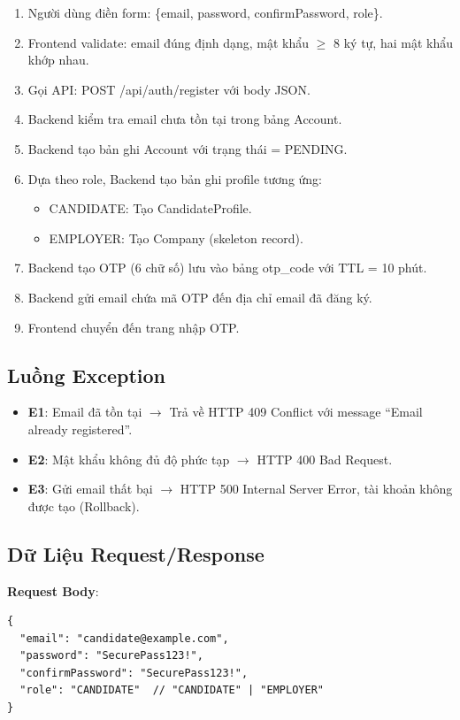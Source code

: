 \documentclass[12pt, a4paper]{report}
\begin{document}
\begin{enumerate}
    \item Người dùng điền form: \{email, password, confirmPassword, role\}.
    \item Frontend validate: email đúng định dạng, mật khẩu $\geq$ 8 ký tự, hai mật khẩu khớp nhau.
    \item Gọi API: POST /api/auth/register với body JSON.
    \item Backend kiểm tra email chưa tồn tại trong bảng Account.
    \item Backend tạo bản ghi Account với trạng thái = PENDING.
    \item Dựa theo role, Backend tạo bản ghi profile tương ứng:
    \begin{itemize}
        \item CANDIDATE: Tạo CandidateProfile.
        \item EMPLOYER: Tạo Company (skeleton record).
    \end{itemize}
    \item Backend tạo OTP (6 chữ số) lưu vào bảng otp\_code với TTL = 10 phút.
    \item Backend gửi email chứa mã OTP đến địa chỉ email đã đăng ký.
    \item Frontend chuyển đến trang nhập OTP.
\end{enumerate}

\subsection{Luồng Exception}

\begin{itemize}
    \item \textbf{E1}: Email đã tồn tại $\rightarrow$ Trả về HTTP 409 Conflict với message ``Email already registered''.
    \item \textbf{E2}: Mật khẩu không đủ độ phức tạp $\rightarrow$ HTTP 400 Bad Request.
    \item \textbf{E3}: Gửi email thất bại $\rightarrow$ HTTP 500 Internal Server Error, tài khoản không được tạo (Rollback).
\end{itemize}

\subsection{Dữ Liệu Request/Response}

\textbf{Request Body}:
\begin{lstlisting}[style=javastyle]
{
  "email": "candidate@example.com",
  "password": "SecurePass123!",
  "confirmPassword": "SecurePass123!",
  "role": "CANDIDATE"  // "CANDIDATE" | "EMPLOYER"
}
\end{lstlisting}
\end{document}
